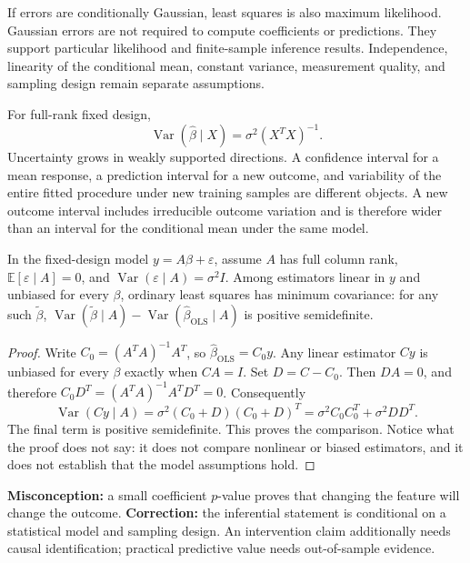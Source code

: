 If errors are conditionally Gaussian, least squares is also maximum likelihood.
Gaussian errors are not required to compute coefficients or predictions. They
support particular likelihood and finite-sample inference results. Independence,
linearity of the conditional mean, constant variance, measurement quality, and
sampling design remain separate assumptions.

For full-rank fixed design,
\[
\operatorname{Var}(\widehat\beta\mid X)=\sigma^2(X^TX)^{-1}.
\]
Uncertainty grows in weakly supported directions. A confidence interval for a
mean response, a prediction interval for a new outcome, and variability of the
entire fitted procedure under new training samples are different objects. A new
outcome interval includes irreducible outcome variation and is therefore wider
than an interval for the conditional mean under the same model.

\begin{theorem}
\label{thm:gauss-markov}
In the fixed-design model $y=A\beta+\varepsilon$, assume $A$ has full column
rank, $\mathbb{E}[\varepsilon\mid A]=0$, and
$\operatorname{Var}(\varepsilon\mid A)=\sigma^2I$. Among estimators linear in
$y$ and unbiased for every $\beta$, ordinary least squares has minimum
covariance: for any such $\widetilde\beta$,
$\operatorname{Var}(\widetilde\beta\mid A)-
\operatorname{Var}(\widehat\beta_{\mathrm{OLS}}\mid A)$ is positive
semidefinite.
\end{theorem}

\begin{proof}
Write $C_0=(A^TA)^{-1}A^T$, so
$\widehat\beta_{\mathrm{OLS}}=C_0y$. Any linear estimator $Cy$ is unbiased for
every $\beta$ exactly when $CA=I$. Set $D=C-C_0$. Then $DA=0$, and therefore
$C_0D^T=(A^TA)^{-1}A^TD^T=0$. Consequently
\[
\operatorname{Var}(Cy\mid A)
=\sigma^2(C_0+D)(C_0+D)^T
=\sigma^2C_0C_0^T+\sigma^2DD^T.
\]
The final term is positive semidefinite. This proves the comparison. Notice
what the proof does not say: it does not compare nonlinear or biased
estimators, and it does not establish that the model assumptions hold.
\end{proof}

\begin{misconceptionbox}
\textbf{Misconception:} a small coefficient $p$-value proves that changing the
feature will change the outcome. \textbf{Correction:} the inferential statement
is conditional on a statistical model and sampling design. An intervention
claim additionally needs causal identification; practical predictive value
needs out-of-sample evidence.
\end{misconceptionbox}

